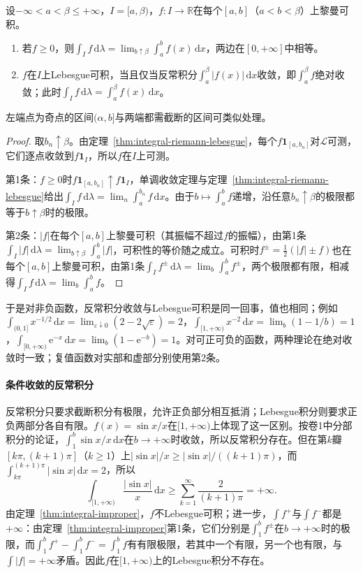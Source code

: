 \begin{theorem}[反常积分与Lebesgue积分]
\label{thm:integral-improper}
设$-\infty<a<\beta\le+\infty$，$I=[a,\beta)$，$f:I\to\mathbb R$在每个$[a,b]$（$a<b<\beta$）上黎曼可积。
\begin{enumerate}
 \item 若$f\ge0$，则$\int_If\,\mathrm d\lambda=\lim_{b\uparrow\beta}\int_a^bf(x)\,\mathrm dx$，两边在$[0,+\infty]$中相等。
 \item $f$在$I$上Lebesgue可积，当且仅当反常积分$\int_a^\beta|f(x)|\,\mathrm dx$收敛，即$\int_a^\beta f$绝对收敛；此时$\int_If\,\mathrm d\lambda=\int_a^\beta f(x)\,\mathrm dx$。
\end{enumerate}
左端点为奇点的区间$(\alpha,b]$与两端都需截断的区间可类似处理。
\end{theorem}

\begin{proof}
取$b_n\uparrow\beta$。由定理~\ref{thm:integral-riemann-lebesgue}，每个$f\mathbf 1_{[a,b_n]}$对$\mathcal L$可测，它们逐点收敛到$f\mathbf 1_I$，所以$f$在$I$上可测。

第1条：$f\ge0$时$f\mathbf 1_{[a,b_n]}\uparrow f\mathbf 1_I$，单调收敛定理与定理~\ref{thm:integral-riemann-lebesgue}给出$\int_If\,\mathrm d\lambda=\lim_n\int_a^{b_n}f\,\mathrm dx$。由于$b\mapsto\int_a^bf$递增，沿任意$b_n\uparrow\beta$的极限都等于$b\uparrow\beta$时的极限。

第2条：$|f|$在每个$[a,b]$上黎曼可积（其振幅不超过$f$的振幅），由第1条$\int_I|f|\,\mathrm d\lambda=\lim_{b\uparrow\beta}\int_a^b|f|$，可积性的等价随之成立。可积时$f^\pm=\frac12(|f|\pm f)$也在每个$[a,b]$上黎曼可积，由第1条$\int_If^\pm\,\mathrm d\lambda=\lim_b\int_a^bf^\pm$，两个极限都有限，相减得$\int_If\,\mathrm d\lambda=\lim_b\int_a^bf$。
\end{proof}

于是对非负函数，反常积分收敛与Lebesgue可积是同一回事，值也相同；例如$\int_{(0,1]}x^{-1/2}\,\mathrm dx=\lim_{\varepsilon\downarrow0}(2-2\sqrt\varepsilon)=2$，$\int_{[1,+\infty)}x^{-2}\,\mathrm dx=\lim_b(1-1/b)=1$，$\int_{[0,+\infty)}\mathrm e^{-x}\,\mathrm dx=\lim_b(1-\mathrm e^{-b})=1$。对可正可负的函数，两种理论在绝对收敛时一致；复值函数对实部和虚部分别使用第2条。

\paragraph{条件收敛的反常积分}
反常积分只要求截断积分有极限，允许正负部分相互抵消；Lebesgue积分则要求正负两部分各自有限。$f(x)=\sin x/x$在$[1,+\infty)$上体现了这一区别。按卷1中分部积分的论证，$\int_1^b\sin x/x\,\mathrm dx$在$b\to+\infty$时收敛，所以反常积分存在。但在第$k$瓣$[k\pi,(k+1)\pi]$（$k\ge1$）上$|\sin x|/x\ge|\sin x|/((k+1)\pi)$，而$\int_{k\pi}^{(k+1)\pi}|\sin x|\,\mathrm dx=2$，所以
\[
 \int_{[1,+\infty)}\frac{|\sin x|}x\,\mathrm dx\ge\sum_{k=1}^\infty\frac2{(k+1)\pi}=+\infty.
\]
由定理~\ref{thm:integral-improper}，$f$不Lebesgue可积；进一步，$\int f^+$与$\int f^-$都是$+\infty$：由定理~\ref{thm:integral-improper}第1条，它们分别是$\int_1^bf^\pm$在$b\to+\infty$时的极限，而$\int_1^bf^+-\int_1^bf^-=\int_1^bf$有有限极限，若其中一个有限，另一个也有限，与$\int|f|=+\infty$矛盾。因此$f$在$[1,+\infty)$上的Lebesgue积分不存在。

